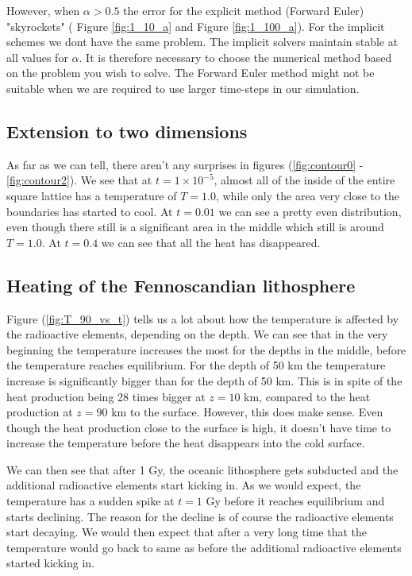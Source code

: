 \documentclass{article}
\begin{document}
\begin{multicols}{2}
However, when $\alpha>0.5$ the error for the explicit method (Forward Euler) "skyrockets" ( Figure \ref{fig:1_10_a} and Figure \ref{fig:1_100_a}). For the implicit schemes we dont have the same problem. The implicit solvers maintain stable at all values for $\alpha$. It is therefore necessary to choose the numerical method based on the problem you wish to solve. The Forward Euler method might not be suitable when we are required to use larger time-steps in our simulation. 

\subsection{Extension to two dimensions}

As far as we can tell, there aren't any surprises in figures (\ref{fig:contour0} - \ref{fig:contour2}). We see that at $t=1\times10^{-5}$, almost all of the inside of the entire square lattice has a temperature of $T=1.0$, while only the area very close to the boundaries has started to cool. At $t=0.01$ we can see a pretty even distribution, even though there still is a significant area in the middle which still is around $T=1.0$. At $t=0.4$ we can see that all the heat has disappeared.  

\subsection{Heating of the Fennoscandian lithosphere}

Figure (\ref{fig:T_90_vs_t}) tells us a lot about how the temperature is affected by the radioactive elements, depending on the depth. We can see that in the very beginning the temperature increases the most for the depths in the middle, before the temperature reaches equilibrium. For the depth of 50 km the temperature increase is significantly bigger than for the depth of 50 km. This is in spite of the heat production being 28 times bigger at $z=10$ km, compared to the heat production at $z=90$ km to the surface. However, this does make sense. Even though the heat production close to the surface is high, it doesn't have time to increase the temperature before the heat disappears into the cold surface. 

We can then see that after 1 Gy, the oceanic lithosphere gets subducted and the additional radioactive elements start kicking in. As we would expect, the temperature has a sudden spike at $t=1$ Gy before it reaches equilibrium and starts declining. The reason for the decline is of course the radioactive elements start decaying. We would then expect that after a very long time that the temperature would go back to same as before the additional radioactive elements started kicking in. 


\end{multicols}
\end{document}
